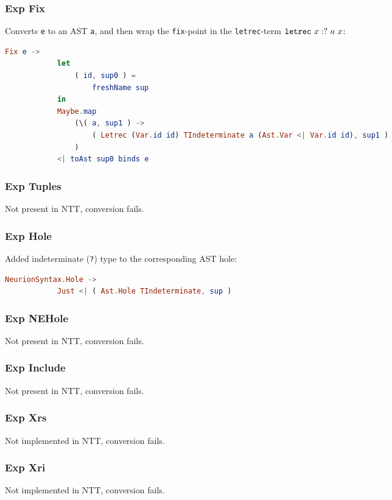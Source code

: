 \documentclass[10pt,a4paper,english]{article}
\newcommand\letrec[3]{\texttt{letrec}~#1~#2~#3}
\begin{document}
\subsubsection*{Exp Fix}
Converts \texttt{e} to an AST \texttt{a}, and then wrap the \texttt{fix}-point in the \texttt{letrec}-term $\letrec{\bind{x}{?}}{a}{x}$:
\begin{lstlisting}[language=elm,%
                     label="eval-evaluated",%
                     gobble=8,%
                     ]
        Fix e ->
            let
                ( id, sup0 ) =
                    freshName sup
            in
            Maybe.map
                (\( a, sup1 ) ->
                    ( Letrec (Var.id id) TIndeterminate a (Ast.Var <| Var.id id), sup1 )
                )
            <| toAst sup0 binds e
\end{lstlisting}

\subsubsection*{Exp Tuples}
Not present in NTT, conversion fails.

\subsubsection*{Exp Hole}
Added indeterminate (\texttt{?}) type to the corresponding AST hole:
\begin{lstlisting}[language=elm,%
                     label="eval-evaluated",%
                     gobble=8,%
                     ]
        NeurionSyntax.Hole ->
            Just <| ( Ast.Hole TIndeterminate, sup )
\end{lstlisting}

\subsubsection*{Exp NEHole}
Not present in NTT, conversion fails.

\subsubsection*{Exp Include}
Not present in NTT, conversion fails.

\subsubsection*{Exp Xrs}
Not implemented in NTT, conversion fails.

\subsubsection*{Exp Xri}
Not implemented in NTT, conversion fails.
\end{document}
